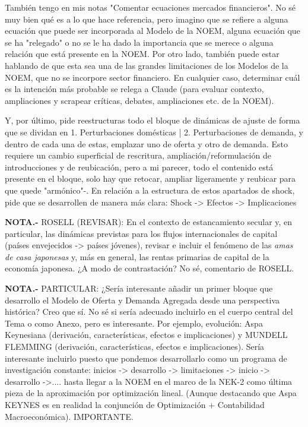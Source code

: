 \documentclass[10pt,a4paper]{article}
\begin{document}
{    También tengo en mis notas "Comentar ecuaciones mercados financieros". No sé muy bien qué es a lo que hace referencia, pero imagino que se refiere a alguna ecuación que puede ser incorporada al Modelo de la NOEM, alguna ecuación que se ha "relegado" o no se le ha dado la importancia que se merece o alguna relación que está presente en la NOEM. Por otro lado, también puede estar hablando de que esta sea una de las grandes limitaciones de los Modelos de la NOEM, que no se incorpore sector financiero. En cualquier caso, determinar cuál es la intención más probable se relega a Claude (para evaluar contexto, ampliaciones y scrapear críticas, debates, ampliaciones etc. de la NOEM). 

    Y, por último, pide reestructuras todo el bloque de dinámicas de ajuste de forma que se dividan en 1. Perturbaciones domésticas | 2. Perturbaciones de demanda, y dentro de cada una de estas, emplazar uno de oferta y otro de demanda. Esto requiere un cambio superficial de rescritura, ampliación/reformulación de introducciones y de reubicación, pero a mi parecer, todo el contenido está presente en el bloque, solo hay que retocar, ampliar ligeramente y reubicar para que quede "armónico"-. En relación a la estructura de estos apartados de shock, pide que se desarrollen de manera más clara: Shock -> Efectos -> Implicaciones

    \textbf{NOTA.-} ROSELL (REVISAR): En el contexto de estancamiento secular y, en particular, las dinámicas previstas para los flujos internacionales de capital (países envejecidos -> países jóvenes), revisar e incluir el fenómeno de las \textit{amas de casa japonesas} y, más en general, las rentas primarias de capital de la economía japonesa. ¿A modo de contrastación? No sé, comentario de ROSELL. 

    \textbf{NOTA.-} PARTICULAR: ¿Sería interesante añadir un primer bloque que desarrollo el Modelo de Oferta y Demanda Agregada desde una perspectiva histórica? Creo que sí. No sé si sería adecuado incluirlo en el cuerpo central del Tema o como Anexo, pero es interesante. Por ejemplo, evolución: Aspa Keynesiana (derivación, características, efectos e implicaciones) y MUNDELL FLEMMING (derivación, características, efectos e implicaciones). Sería interesante incluirlo puesto que pondemos desarrollarlo como un programa de investigación constante: inicios -> desarrollo -> limitaciones -> inicio -> desarrollo ->.... hasta llegar a la NOEM en el marco de la NEK-2 como última pieza de la aproximación por optimización lineal. (Aunque destacando que Aspa KEYNES es en realidad la conjunción de Optimización + Contabilidad Macroeconómica). IMPORTANTE.  
    }
\end{document}
